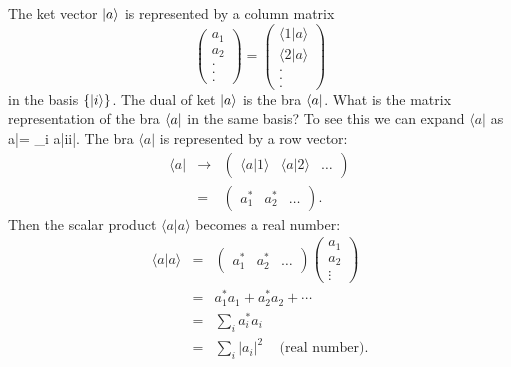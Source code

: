 The ket vector $\ket{a}$ is represented by a column matrix 
\[
\begin{pmatrix}
a_1\\a_2\\.\\.\\.
\end{pmatrix}=\begin{pmatrix}
\langle 1 |a\rangle\\ \langle 2 |a\rangle  \\.\\.\\.
\end{pmatrix}
\]
in the basis $\{\ket{i}\}$. The dual of ket $\ket{a}$ is the bra $\bra{a}$. What is the matrix representation of the bra $\bra{a}$ in the same basis? To see this we can expand $\langle a|$ as
\be
\langle a|= \sum_i \langle a|i\rangle \langle i|.
\ee
The bra $\langle a|$ is represented by a row vector:
\begin{eqnarray}
\langle a| &\rightarrow &  \begin{pmatrix}
\langle a|1\rangle & \langle a|2\rangle & \ldots
\end{pmatrix} \nonumber \\
 &=& \begin{pmatrix}
a_1^* & a_2^* & \ldots \end{pmatrix}. 
\end{eqnarray}
Then the scalar product $\langle a|a\rangle$ becomes a real number:
\begin{eqnarray}
\langle a|a\rangle &=& \begin{pmatrix}
a_1^* & a_2^* & \ldots
\end{pmatrix} \begin{pmatrix}
a_1\\a_2\\ \vdots
\end{pmatrix} \nonumber \\
 &=& a_1^*a_1 + a_2^*a_2 + \cdots \nonumber \\
 &=& \sum_i a_i^* a_i \nonumber \\
 &=& \sum_i |a_i|^2\;\;\; \text{ (real number).} 
\end{eqnarray}


